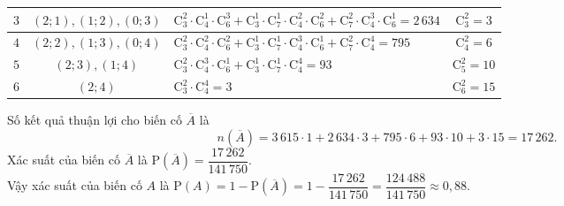 \begin{ex}
{\begin{center}
\begin{tabular}{|c|c|l|c|}
				$3$ & $(2;1), (1;2), (0;3)$ & $\mathrm{C}_3^2\cdot\mathrm{C}_4^1\cdot\mathrm{C}_6^3+\mathrm{C}_3^1\cdot\mathrm{C}_7^1\cdot\mathrm{C}_4^2\cdot\mathrm{C}_6^2+\mathrm{C}_7^2\cdot\mathrm{C}_4^3\cdot\mathrm{C}_6^1=2\,634$ & $\mathrm{C}_3^2=3$\\
				\hline
				$4$ & $(2;2), (1;3), (0;4)$ & $\mathrm{C}_3^2\cdot\mathrm{C}_4^2\cdot\mathrm{C}_6^2+\mathrm{C}_3^1\cdot\mathrm{C}_7^1\cdot\mathrm{C}_4^3\cdot\mathrm{C}_6^1+\mathrm{C}_7^2\cdot\mathrm{C}_4^4=795$ & $\mathrm{C}_4^2=6$\\
				\hline
				$5$ & $(2;3), (1;4)$ & $\mathrm{C}_3^2\cdot\mathrm{C}_4^3\cdot\mathrm{C}_6^1+\mathrm{C}_3^1\cdot\mathrm{C}_7^1\cdot\mathrm{C}_4^4=93$ & $\mathrm{C}_5^2=10$\\
				\hline
				$6$ & $(2;4)$ & $\mathrm{C}_3^2\cdot\mathrm{C}_4^4=3$ & $\mathrm{C}_6^2=15$\\
				\hline
			\end{tabular}
		\end{center}
		Số kết quả thuận lợi cho biến cố $\overline{A}$ là 
		\[
		n\left(\overline{A}\right)=3\,615 \cdot 1 + 2\,634 \cdot 3 + 795 \cdot 6 + 93 \cdot 10 + 3 \cdot 15 = 17\,262.
		\]
		Xác suất của biến cố $\overline{A}$ là $\mathrm{P}\left(\overline{A}\right) = \dfrac{17\,262}{141\,750}$.\\
		Vậy xác suất của biến cố $A$ là $\mathrm{P}(A) = 1 - \mathrm{P}\left(\overline{A}\right)=1 - \dfrac{17\,262}{141\,750} = \dfrac{124\,488}{141\,750} \approx 0{,}88$.
	}
\end{ex}

